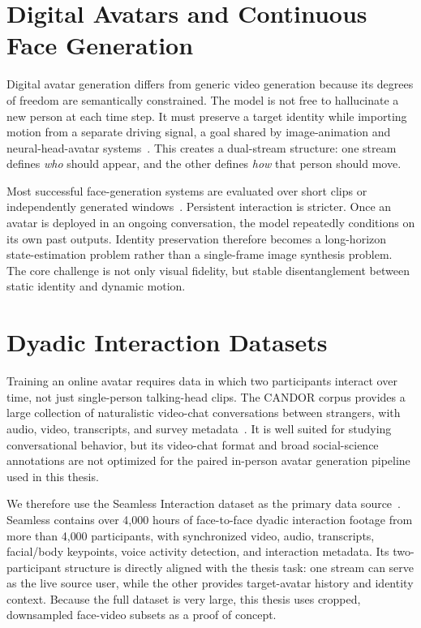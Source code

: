 \documentclass[12pt,letterpaper]{report}
\begin{document}
\section{Digital Avatars and Continuous Face Generation}

Digital avatar generation differs from generic video generation because its degrees of freedom are semantically constrained. The model is not free to hallucinate a new person at each time step. It must preserve a target identity while importing motion from a separate driving signal, a goal shared by image-animation and neural-head-avatar systems~\cite{siarohin2019first, drobyshev2022megaportraits}. This creates a dual-stream structure: one stream defines \emph{who} should appear, and the other defines \emph{how} that person should move.

Most successful face-generation systems are evaluated over short clips or independently generated windows~\cite{siarohin2019first, wang2021facevid2vid, drobyshev2022megaportraits}. Persistent interaction is stricter. Once an avatar is deployed in an ongoing conversation, the model repeatedly conditions on its own past outputs. Identity preservation therefore becomes a long-horizon state-estimation problem rather than a single-frame image synthesis problem. The core challenge is not only visual fidelity, but stable disentanglement between static identity and dynamic motion.

\section{Dyadic Interaction Datasets}

Training an online avatar requires data in which two participants interact over time, not just single-person talking-head clips. The CANDOR corpus provides a large collection of naturalistic video-chat conversations between strangers, with audio, video, transcripts, and survey metadata~\cite{reece2023candor}. It is well suited for studying conversational behavior, but its video-chat format and broad social-science annotations are not optimized for the paired in-person avatar generation pipeline used in this thesis.

We therefore use the Seamless Interaction dataset as the primary data source~\cite{seamlessinteraction2025}. Seamless contains over 4{,}000 hours of face-to-face dyadic interaction footage from more than 4{,}000 participants, with synchronized video, audio, transcripts, facial/body keypoints, voice activity detection, and interaction metadata. Its two-participant structure is directly aligned with the thesis task: one stream can serve as the live source user, while the other provides target-avatar history and identity context. Because the full dataset is very large, this thesis uses cropped, downsampled face-video subsets as a proof of concept.
\end{document}
